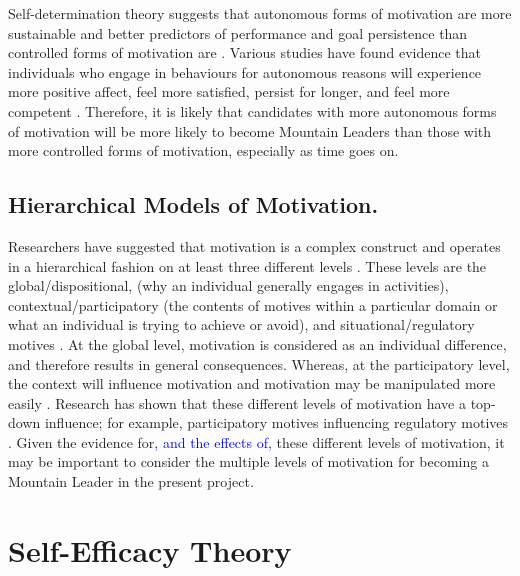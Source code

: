 \documentclass[
  12pt,
  a4paper,
]{book}
\begin{document}
Self-determination theory suggests that autonomous forms of motivation are more sustainable and better predictors of performance and goal persistence than controlled forms of motivation are \citep{Hagger2015, Pelletier2001, Ryan2019}. Various studies have found evidence that individuals who engage in behaviours for autonomous reasons will experience more positive affect, feel more satisfied, persist for longer, and feel more competent \citep[cf.~][]{Frederick-Recascino2002}. Therefore, it is likely that candidates with more autonomous forms of motivation will be more likely to become Mountain Leaders than those with more controlled forms of motivation, especially as time goes on.

\hypertarget{hierarchical-models-of-motivation.}{%
\subsection{Hierarchical Models of Motivation.}\label{hierarchical-models-of-motivation.}}

Researchers have suggested that motivation is a complex construct and operates in a hierarchical fashion on at least three different levels \citep[e.g.,][]{Ingledew2009, Vallerand1997, Vallerand2002}. These levels are the global/dispositional, (why an individual generally engages in activities), contextual/participatory (the contents of motives within a particular domain or what an individual is trying to achieve or avoid), and situational/regulatory motives \citep[the perceived locus of causality of the behavioural goals---where the motive sits on the relative autonomy continuum;][]{Deci2000, Ingledew2009, Vallerand1997, Vallerand2002}. At the global level, motivation is considered as an individual difference, and therefore results in general consequences. Whereas, at the participatory level, the context will influence motivation and motivation may be manipulated more easily \citep{Vallerand2002}. Research has shown that these different levels of motivation have a top-down influence; for example, participatory motives influencing regulatory motives \citep{Ingledew2009}. Given the evidence for\textcolor{blue}{, and the effects of,} these different levels of motivation, it may be important to consider the multiple levels of motivation for becoming a Mountain Leader in the present project.

\hypertarget{gen-intro-self-efficacy}{%
\section{Self-Efficacy Theory}\label{gen-intro-self-efficacy}}
\end{document}
